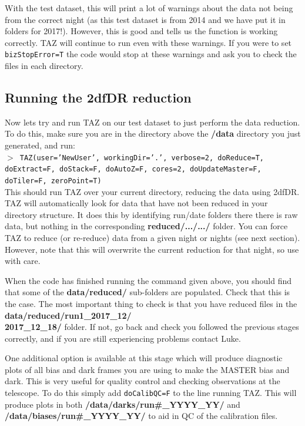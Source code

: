 \documentclass[12pt]{article}
\begin{document}
With the test dataset, this will print a lot of warnings about the data not being from the correct night (as this test dataset is from 2014 and we have put it in folders for 2017!). However, this is good and tells us the function is working correctly. TAZ will continue to run even with these warnings. If you were to set \texttt{bizStopError=T} the code would stop at these warnings and ask you to check the files in each directory.     


\subsection{Running the 2dfDR reduction}

Now lets try and run TAZ on our test dataset to just perform the data reduction. To do this, make sure you are in the directory above the \textbf{/data} directory you just generated, and run:\\

\hspace{10mm} \texttt{$>$ TAZ(user='NewUser', workingDir='.', verbose=2, doReduce=T, doExtract=F, doStack=F, doAutoZ=F, cores=2, doUpdateMaster=F, doTiler=F, zeroPoint=T)}\\

This should run TAZ over your current directory, reducing the data using 2dfDR. TAZ will automatically look for data that have not been reduced in your directory structure. It does this by identifying run/date folders there there is raw data, but nothing in the corresponding \textbf{reduced/.../.../} folder. You can force TAZ to reduce (or re-reduce) data from a given night or nights (see next section). However, note that this will overwrite the current reduction for that night, so use with care. 

When the code has finished running the command given above, you should find that some of the \textbf{data/reduced/} sub-folders are populated. Check that this is the case. The most important thing to check is that you have reduced files in the \textbf{data/reduced/run1\_2017\_12/ \\ 2017\_12\_18/} folder.  If not, go back and check you followed the previous stages correctly, and if you are still experiencing problems contact Luke.  

One additional option is available at this stage which will produce diagnostic plots of all bias and dark frames you are using to make the MASTER bias and dark. This is very useful for quality control and checking observations at the telescope. To do this simply add \texttt{doCalibQC=F} to the line running TAZ. This will produce plots in both \textbf{/data/darks/run\#\_YYYY\_YY/} and \textbf{/data/biases/run\#\_YYYY\_YY/} to aid in QC of the calibration files.
\end{document}
